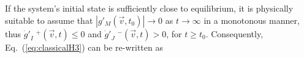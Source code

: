 \begin{comment}
Cells with ${{\dot{g}}'}_I\phantom{.}\!^{+}(\vec{v},t)$, $I=1,\,\dots\,,L$, 
have an excess of particles and/or energy (relative to the mean value in equilibrium).
In contrast, cells with ${{\dot{g}}'}_J\phantom{.}\!^{-}(\vec{v},t)$, $J=1,\,\dots\,,P$,
have a scarcity of particles and/or energy
(relative to the mean value in equilibrium).
In addition, $\dot{g}^{+}_{J}$ represents the
change on the deviation on cells that have an excess of particles or energy
while $\dot{g}^{-}_{J}$  represents the change on the deviations on cells that
have missing particles or energy.
On the other hand, $g^{+}_{J}$  represents the value of the deviation on cells
that have an excess of particles or energy. In contrast, $g^{-}_{J}$ represents
the value of the deviation on cells that have missing particles or energy.
Also, on the one hand, $\dot{g}^{+}_{J}<0$ describes the loss of particles
and/or energy and so, $g^{+}_{J}>0$. On the other hand, $\dot{g}^{-}_{J}>0$
describes the gain of particles and/or energy and therefore $g^{-}_{J}<0$.

We sort the previous ideas in the following form
%
\begin{equation}\label{separacionclassical}
\begin{array}{rl}
  g^{+}_{J}=+|g^{+}_{J}|; & \dot{g}^{+}_{J}=-|\dot{g}^{+}_{J}|,\\
  g^{-}_{J}=-|g^{-}_{J}|; & \dot{g}^{-}_{J}=+|\dot{g}^{-}_{J}|,
 \end{array}
\end{equation}
%
and consequently, (\ref{classicalH3}) obtains the following form


We can observe that $\bar{f}(\vec{v})$ in (\ref{eq:classicalH4}) is always
positive. Also the deviation and its derivative are positive, then all the
expression is positive. However, the global sign makes the derivative of the
$\mathcal{H}'$ with respect to time is always less to zero. With this we proved that
$\frac{d\mathcal{H}'}{dt}<0$. If the system is in equilibrium,
$g_{J}(\vec{v},t)=\dot g_J(\vec{v},t)=0$, therefore $\frac{d\mathcal{H}'}{dt}=0$.
\end{comment}
%
If the system's initial state is sufficiently close to equilibrium, it is
physically suitable
to assume that $\left|g'_M(\vec{v},t_0)\right|\to 0$ as $t\to\infty$ in a monotonous manner,
thus ${{\dot{g}}'}_I\phantom{.}\!^{+}(\vec{v},t)\leq0$ and
${{\dot{g}}'}_J\phantom{.}\!^{-}(\vec{v},t)>0$, for $t\geq t_0$. Consequently,
Eq.~(\ref{eq:classicalH3}) can be re-written as

